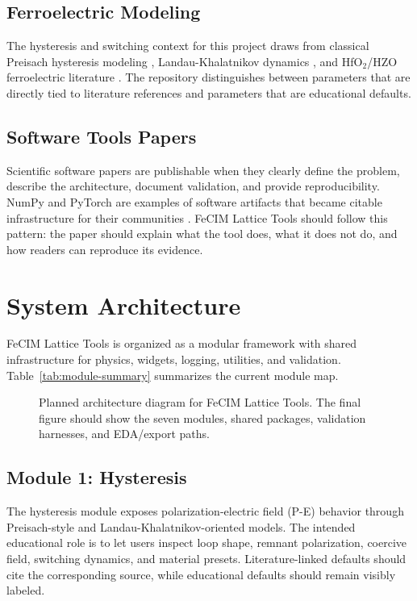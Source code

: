 \documentclass[11pt]{article}
\newcommand{\project}{FeCIM Lattice Tools}
\newcommand{\figplaceholder}[2]{%
  \begin{figure}[ht]
    \centering
    \fbox{\begin{minipage}[c][1.6in][c]{0.88\linewidth}
      \centering #1
    \end{minipage}}
    \caption{#2}
  \end{figure}
}
\begin{document}
\subsection{Ferroelectric Modeling}

The hysteresis and switching context for this project draws from classical Preisach hysteresis modeling \citep{preisach1935,mayergoyz2003}, Landau-Khalatnikov dynamics \citep{khalatnikov1954}, and HfO$_2$/HZO ferroelectric literature \citep{park2015,materlik2015,alessandri2018,guo2018}. The repository distinguishes between parameters that are directly tied to literature references and parameters that are educational defaults.

\subsection{Software Tools Papers}

Scientific software papers are publishable when they clearly define the problem, describe the architecture, document validation, and provide reproducibility. NumPy and PyTorch are examples of software artifacts that became citable infrastructure for their communities \citep{harris2020numpy,paszke2019pytorch}. \project{} should follow this pattern: the paper should explain what the tool does, what it does not do, and how readers can reproduce its evidence.

\section{System Architecture}

\project{} is organized as a modular framework with shared infrastructure for physics, widgets, logging, utilities, and validation. Table~\ref{tab:module-summary} summarizes the current module map.



\figplaceholder{Architecture figure placeholder}{Planned architecture diagram for \project. The final figure should show the seven modules, shared packages, validation harnesses, and EDA/export paths.}

\subsection{Module 1: Hysteresis}

The hysteresis module exposes polarization-electric field (P-E) behavior through Preisach-style and Landau-Khalatnikov-oriented models. The intended educational role is to let users inspect loop shape, remnant polarization, coercive field, switching dynamics, and material presets. Literature-linked defaults should cite the corresponding source, while educational defaults should remain visibly labeled.
\end{document}
